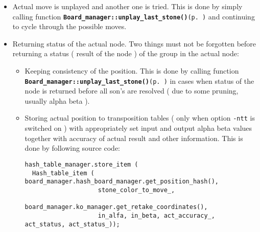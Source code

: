 \begin{itemize}
\item Actual move is unplayed and another one is tried. This is done by simply calling function {\tt {\bf Board\_\-manager::unplay\_\-last\_\-stone()}{\rm (p.\,\pageref{classBoard__manager_a16})}} and continuing to cycle through the possible moves.\item Returning status of the actual node. Two things must not be forgotten before returning a status ( result of the node ) of the group in the actual node:\begin{itemize}
\item Keeping consistency of the position. This is done by calling function {\tt {\bf Board\_\-manager::unplay\_\-last\_\-stone()}{\rm (p.\,\pageref{classBoard__manager_a16})}} in cases when status of the node is returned before all son's are resolved ( due to some pruning, usually alpha beta ).\item Storing actual position to transposition tables ( only when option {\tt -ntt} is switched on ) with appropriately set input and output alpha beta values together with accuracy of actual result and other information. This is done by following source code: 

\footnotesize\begin{verbatim}hash_table_manager.store_item ( 
  Hash_table_item ( board_manager.hash_board_manager.get_position_hash(),
                    stone_color_to_move_,
                    board_manager.ko_manager.get_retake_coordinates(),
                    in_alfa, in_beta, act_accuracy_, act_status, act_status_)); 
\end{verbatim}
\normalsize
\end{itemize}
\end{itemize}
